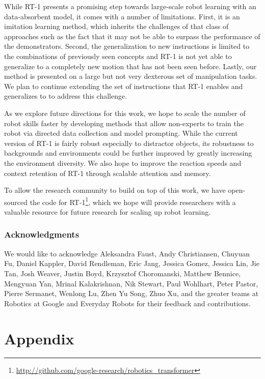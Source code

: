 \documentclass{article} %
\newcommand{\algname}{RT-1\xspace}
\begin{document}
While \algname presents a promising step towards large-scale robot learning with an data-absorbent model, it comes with a number of limitations. First, it is an imitation learning method, which inherits the challenges of that class of approaches such as the fact that it may not be able to surpass the performance of the demonstrators. Second, the generalization to new instructions is limited to the combinations of previously seen concepts and \algname is not yet able to generalize to a completely new motion that has not been seen before. Lastly, our method is presented on a large but not very dexterous set of manipulation tasks. We plan to continue extending the set of instructions that \algname enables and generalizes to to address this challenge.

As we explore future directions for this work, we hope to scale the number of robot skills faster by developing methods that allow non-experts to train the robot via directed data collection and model prompting. While the current version of \algname is fairly robust especially to distractor objects, its robustness to backgrounds and environments could be further improved by greatly increasing the environment diversity. We also hope to improve the reaction speeds and context retention of \algname through scalable attention and memory. 

To allow the research community to build on top of this work, we have open-sourced the code for \algname\footnote{\url{http://github.com/google-research/robotics_transformer}}, which we hope will provide researchers with a valuable resource for future research for scaling up robot learning.

\subsubsection*{Acknowledgments}

We would like to acknowledge Aleksandra Faust, Andy Christiansen, Chuyuan Fu, Daniel Kappler, David Rendleman, Eric Jang, Jessica Gomez, Jessica Lin, Jie Tan, Josh Weaver, Justin Boyd, Krzysztof Choromanski, Matthew Bennice, Mengyuan Yan, Mrinal Kalakrishnan, Nik Stewart, Paul Wohlhart, Peter Pastor, Pierre Sermanet, Wenlong Lu, Zhen Yu Song, Zhuo Xu, and the greater teams at Robotics at Google and Everyday Robots for their feedback and contributions.




\newpage
\appendix
\section*{Appendix}
\label{sec:app}
\end{document}
